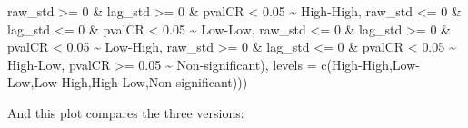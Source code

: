 \documentclass[
]{book}
\newenvironment{Shaded}{\begin{snugshade}}{\end{snugshade}}
\newcommand{\AttributeTok}[1]{\textcolor[rgb]{0.77,0.63,0.00}{#1}}
\newcommand{\DecValTok}[1]{\textcolor[rgb]{0.00,0.00,0.81}{#1}}
\newcommand{\FloatTok}[1]{\textcolor[rgb]{0.00,0.00,0.81}{#1}}
\newcommand{\FunctionTok}[1]{\textcolor[rgb]{0.00,0.00,0.00}{#1}}
\newcommand{\NormalTok}[1]{#1}
\newcommand{\SpecialCharTok}[1]{\textcolor[rgb]{0.00,0.00,0.00}{#1}}
\newcommand{\StringTok}[1]{\textcolor[rgb]{0.31,0.60,0.02}{#1}}
\begin{document}
\begin{Shaded}
\begin{Highlighting}[]
\NormalTok{           raw\_std }\SpecialCharTok{\textgreater{}=} \DecValTok{0} \SpecialCharTok{\&}\NormalTok{ lag\_std }\SpecialCharTok{\textgreater{}=} \DecValTok{0} \SpecialCharTok{\&}\NormalTok{ pvalCR }\SpecialCharTok{\textless{}} \FloatTok{0.05} \SpecialCharTok{\textasciitilde{}} \StringTok{\textquotesingle{}High{-}High\textquotesingle{}}\NormalTok{,}
\NormalTok{            raw\_std }\SpecialCharTok{\textless{}=} \DecValTok{0} \SpecialCharTok{\&}\NormalTok{ lag\_std }\SpecialCharTok{\textless{}=} \DecValTok{0} \SpecialCharTok{\&}\NormalTok{ pvalCR }\SpecialCharTok{\textless{}} \FloatTok{0.05} \SpecialCharTok{\textasciitilde{}} \StringTok{\textquotesingle{}Low{-}Low\textquotesingle{}}\NormalTok{,}
\NormalTok{            raw\_std }\SpecialCharTok{\textless{}=} \DecValTok{0} \SpecialCharTok{\&}\NormalTok{ lag\_std }\SpecialCharTok{\textgreater{}=} \DecValTok{0} \SpecialCharTok{\&}\NormalTok{ pvalCR }\SpecialCharTok{\textless{}} \FloatTok{0.05} \SpecialCharTok{\textasciitilde{}} \StringTok{\textquotesingle{}Low{-}High\textquotesingle{}}\NormalTok{,}
\NormalTok{            raw\_std }\SpecialCharTok{\textgreater{}=} \DecValTok{0} \SpecialCharTok{\&}\NormalTok{ lag\_std }\SpecialCharTok{\textless{}=} \DecValTok{0} \SpecialCharTok{\&}\NormalTok{ pvalCR }\SpecialCharTok{\textless{}} \FloatTok{0.05} \SpecialCharTok{\textasciitilde{}} \StringTok{\textquotesingle{}High{-}Low\textquotesingle{}}\NormalTok{,}
\NormalTok{            pvalCR }\SpecialCharTok{\textgreater{}=} \FloatTok{0.05} \SpecialCharTok{\textasciitilde{}} \StringTok{\textquotesingle{}Non{-}significant\textquotesingle{}}\NormalTok{),}
           \AttributeTok{levels =} \FunctionTok{c}\NormalTok{(}\StringTok{\textquotesingle{}High{-}High\textquotesingle{}}\NormalTok{,}\StringTok{\textquotesingle{}Low{-}Low\textquotesingle{}}\NormalTok{,}\StringTok{\textquotesingle{}Low{-}High\textquotesingle{}}\NormalTok{,}\StringTok{\textquotesingle{}High{-}Low\textquotesingle{}}\NormalTok{,}\StringTok{\textquotesingle{}Non{-}significant\textquotesingle{}}\NormalTok{)))}
\end{Highlighting}
\end{Shaded}

And this plot compares the three versions:
\end{document}

